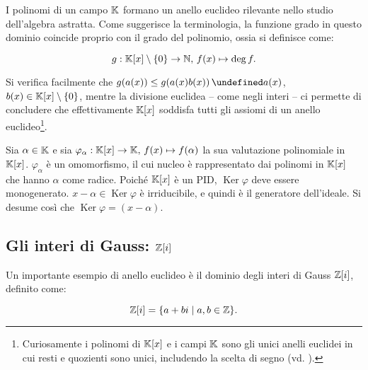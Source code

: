 \documentclass[a4paper]{article}
\DeclareMathOperator{\Ker}{Ker}
\let\oldforall\forall
\let\forall\undefined
\DeclareMathOperator{\forall}{\oldforall}
\begin{document}
I polinomi di un campo $\mathbb{K}$ formano un anello euclideo rilevante
nello studio dell'algebra astratta. Come suggerisce la
terminologia, la funzione grado in questo dominio coincide
proprio con il grado del polinomio, ossia si definisce come:

\[g : \mathbb{K}[x] \setminus \{0\} \to \mathbb{N}, \, f(x) \mapsto \deg f.\]

\vskip 0.1in

Si verifica facilmente che $g(a(x)) \leq g(a(x)b(x)) \, \forall a(x)$, $b(x) \in \mathbb{K}[x] \setminus \{0\}$, mentre la divisione euclidea -- come negli interi -- ci permette
di concludere che effettivamente $\mathbb{K}[x]$ soddisfa tutti gli assiomi di un anello
euclideo\footnote{Curiosamente i polinomi di $\mathbb{K}[x]$ e i campi $\mathbb{K}$ sono gli unici anelli euclidei in cui resti
    e quozienti sono unici, includendo la scelta di segno (vd.
    \cite{10.2307/2315810}).}.

\begin{example}
    Sia $\alpha \in \mathbb{K}$ e sia $\varphi_\alpha : \mathbb{K}[x] \to \mathbb{K}, \, f(x) \mapsto f(\alpha)$
    la sua valutazione polinomiale in $\mathbb{K}[x]$. $\varphi_\alpha$ è un omomorfismo, il cui
    nucleo è rappresentato dai polinomi in $\mathbb{K}[x]$ che hanno $\alpha$ come radice. Poiché
    $\mathbb{K}[x]$ è un PID, $\Ker \varphi$ deve essere monogenerato. $x-\alpha \in \Ker \varphi$
    è irriducibile, e quindi è il generatore dell'ideale. Si desume così che
    $\Ker \varphi = (x-\alpha)$.
\end{example}

\subsection{Gli interi di Gauss: $\mathbb{Z}[i]$}

Un importante esempio di anello euclideo è il dominio degli interi di Gauss $\mathbb{Z}[i]$, definito come:

\[\mathbb{Z}[i] = \{a+bi \mid a, b \in \mathbb{Z}\}.\]

\vskip 0.1in
\end{document}
